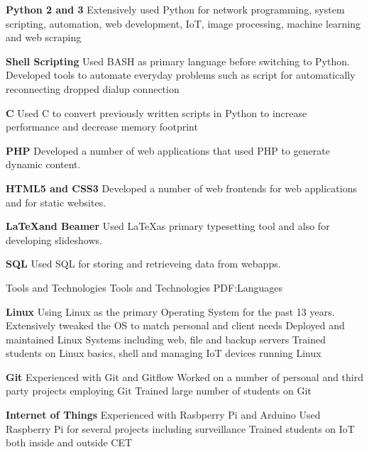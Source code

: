 \documentclass[letterpaper,MMMyyyy,nonstopmode]{simpleresumecv}
\begin{document}
\begin{Body}
\BulletItem
\textbf{Python 2 and 3}
\SubBulletItem
Extensively used Python for network programming, system scripting, automation,
web development, IoT, image processing, machine learning and web scraping

\BigGap
\BulletItem
\textbf{Shell Scripting}
\SubBulletItem
Used BASH as primary language before switching to Python. Developed tools to
automate everyday problems such as script for automatically reconnecting dropped
dialup connection

\BigGap
\BulletItem
\textbf{C}
\SubBulletItem
Used C to convert previously written scripts in Python to increase performance
and decrease memory footprint

\BigGap
\BulletItem
\textbf{PHP}
\SubBulletItem
Developed a number of web applications that used PHP to generate dynamic
content.

\BigGap
\BulletItem
\textbf{HTML5 and CSS3}
\SubBulletItem
Developed a number of web frontends for web applications and for static
websites.

\BigGap
\BulletItem
\textbf{\LaTeX and Beamer}
\SubBulletItem
Used \LaTeX as primary typesetting tool and also for developing slideshows.

\BigGap
\BigGap
\BulletItem
\textbf{SQL}
\SubBulletItem
Used SQL for storing and retrieveing data from webapps.


\BigGap
\Section
{Tools and Technologies}
{Tools and Technologies}
{PDF:Languages}

\BulletItem
\textbf{Linux}
\SubBulletItem
Using Linux as the primary Operating System for the past 13 years.
\SubBulletItem
Extensively tweaked the OS to match personal and client needs
\SubBulletItem
Deployed and maintained Linux Systems including web, file and backup servers
\SubBulletItem
Trained students on Linux basics, shell and managing IoT devices running Linux

\BigGap
\BulletItem
\textbf{Git}
\SubBulletItem
Experienced with Git and Gitflow
\SubBulletItem
Worked on a number of personal and third party projects employing Git
\SubBulletItem
Trained large number of students on Git

\BigGap
\BulletItem
\textbf{Internet of Things}
\SubBulletItem
Experienced with Rasbperry Pi and Arduino 
\SubBulletItem
Used Raspberry Pi for several projects including surveillance
\SubBulletItem
Trained students on IoT both inside and outside CET


\end{Body}
\end{document}
